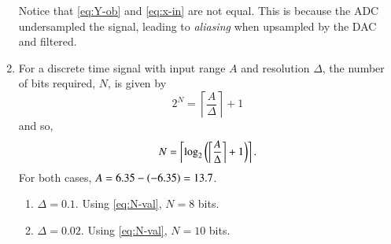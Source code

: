 \documentclass[journal,12pt,twocolumn]{IEEEtran}
\begin{document}
\begin{enumerate}[label=\theenumi.]
    Notice that \eqref{eq:Y-ob} and \eqref{eq:x-in} are not equal. This is
    because the ADC undersampled the signal, leading to \emph{aliasing}
    when upsampled by the DAC and filtered.

    \item For a discrete time signal with input range \(A\) and resolution
    \(\Delta\), the number of bits required, \(N\), is given by
    \begin{equation}
        2^N = \left\lceil\frac{A}{\Delta}\right\rceil + 1
        \label{eq:2-N-quant}
    \end{equation}
    and so,
    \begin{equation}
        N = \left\lceil\log_2\left(\left\lceil\frac{A}{\Delta}\right\rceil + 1\right)\right\rceil.
        \label{eq:N-val}
    \end{equation}
    For both cases, \(A = 6.35-\left(-6.35\right) = 13.7\).
    \begin{enumerate}
        \item \(\Delta = 0.1\). Using \eqref{eq:N-val}, \(N = 8\) bits.
        \item \(\Delta = 0.02\). Using \eqref{eq:N-val}, \(N = 10\) bits.
    \end{enumerate}


\end{enumerate}
\end{document}
